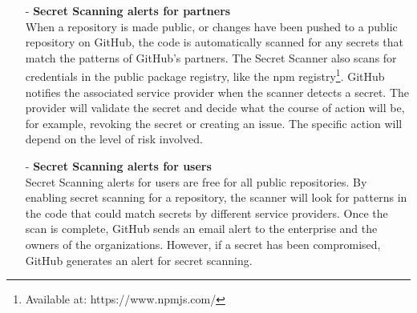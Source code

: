 \begin{itemize}
    \item [-] \textbf{Secret Scanning alerts for partners}\\
    When a repository is made public, or changes have been pushed to a public repository on GitHub, the code is automatically scanned for any secrets that match the patterns of GitHub's partners. The Secret Scanner also scans for credentials in the public package registry, like the npm registry\footnote{Available at: https://www.npmjs.com/}. GitHub notifies the associated service provider when the scanner detects a secret. The provider will validate the secret and decide what the course of action will be, for example, revoking the secret or creating an issue. The specific action will depend on the level of risk involved. 
    
    \item [-] \textbf{Secret Scanning alerts for users}\\
    Secret Scanning alerts for users are free for all public repositories. By enabling secret scanning for a repository, the scanner will look for patterns in the code that could match secrets by different service providers. Once the scan is complete, GitHub sends an email alert to the enterprise and the owners of the organizations. However, if a secret has been compromised, GitHub generates an alert for secret scanning. 
    
\end{itemize}

